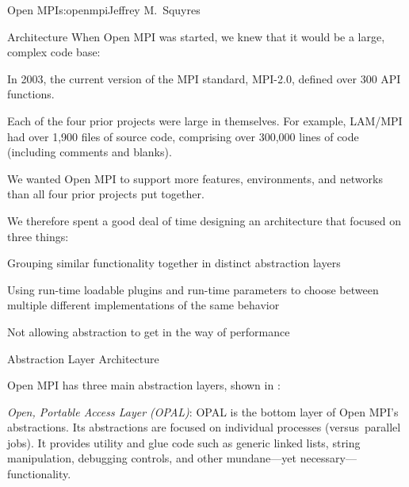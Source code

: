 \begin{aosachapter}{Open MPI}{s:openmpi}{Jeffrey M.\ Squyres}
\begin{aosasect1}{Architecture}
When Open MPI was started, we knew that it would be a large, complex
code base:

\begin{aosaitemize}
\item In 2003, the current version of the MPI standard, MPI-2.0,
  defined over 300 API functions.
\item Each of the four prior projects were large in themselves.  For
  example, LAM/MPI had over 1,900 files of source code, comprising
  over 300,000 lines of code (including comments and blanks).
\item We wanted Open MPI to support more features, environments, and
  networks than all four prior projects put together.
\end{aosaitemize}

\noindent We therefore spent a good deal of time designing an architecture that
focused on three things:

\begin{aosaenumerate}
\item Grouping similar functionality together in distinct abstraction
  layers
\item Using run-time loadable plugins and run-time parameters to
  choose between multiple different implementations of the same
  behavior
\item Not allowing abstraction to get in the way of performance
\end{aosaenumerate}


\begin{aosasect2}{Abstraction Layer Architecture}


\noindent Open MPI has three main abstraction layers, shown in
:

\begin{aosaitemize}
\item \emph{Open, Portable Access Layer (OPAL)}: OPAL is the bottom
  layer of Open MPI's abstractions.  Its abstractions are focused on
  individual processes (versus\ parallel jobs).  It provides utility and
  glue code such as generic linked lists, string manipulation,
  debugging controls, and other mundane---yet necessary---functionality.


\end{aosaitemize}
\end{aosasect2}
\end{aosasect1}
\end{aosachapter}
